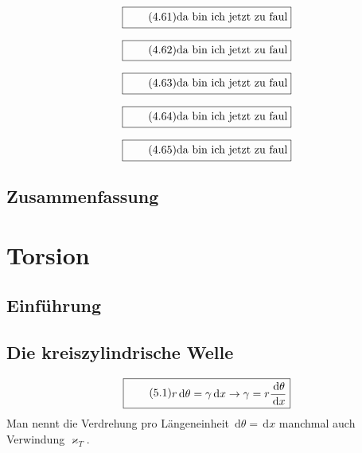 \documentclass[11pt]{article}
\newcommand{\1}{ {\mathds{1}} }
\newcommand{\td}{\,\text{d}}
\begin{document}
\begin{multicols}{2}
		\begin{equation}
			\boxed{
				\tag{4.61}
				\begin{split}
					\text{da bin ich jetzt zu faul}
				\end{split}
			}
		\end{equation}

		\begin{equation}
			\boxed{
				\tag{4.62}
				\begin{split}
					\text{da bin ich jetzt zu faul}
				\end{split}
			}
		\end{equation}
		
		\begin{equation}
			\boxed{
				\tag{4.63}
				\begin{split}
					\text{da bin ich jetzt zu faul}
				\end{split}
			}
		\end{equation}

		\begin{equation}
			\boxed{
				\tag{4.64}
				\begin{split}
					\text{da bin ich jetzt zu faul}
				\end{split}
			}
		\end{equation}

		\begin{equation}
			\boxed{
				\tag{4.65}
				\begin{split}
					\text{da bin ich jetzt zu faul}
				\end{split}
			}
		\end{equation}

		\subsection{Zusammenfassung}
	
		\section{Torsion}
		\subsection{Einführung}
		\subsection{Die kreiszylindrische Welle}

		\begin{equation}
			\boxed{
				\tag{5.1}
				\begin{split}
					r\td \theta = \gamma \td x \rightarrow \gamma = r\frac{\td \theta}{\td x}
				\end{split}
			}
		\end{equation}
		Man nennt die Verdrehung pro Längeneinheit $ \td\theta = \td x $ manchmal auch Verwindung $\varkappa_T$.
		

\end{multicols}
\end{document}
